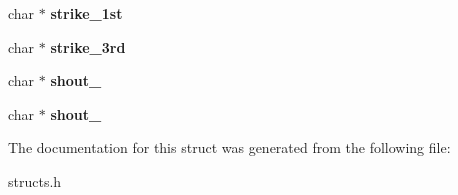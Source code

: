 \begin{DoxyCompactItemize}
\item 
\hypertarget{structtrap__data_a28d2de746f6ee62bdf3c28672a066141}{char $\ast$ {\bfseries strike\-\_\-1st}}\label{structtrap__data_a28d2de746f6ee62bdf3c28672a066141}

\item 
\hypertarget{structtrap__data_a32b2eada9b8ea8c2eede402df18c01bd}{char $\ast$ {\bfseries strike\-\_\-3rd}}\label{structtrap__data_a32b2eada9b8ea8c2eede402df18c01bd}

\item 
\hypertarget{structtrap__data_a1c0410d9842861b6f656e72166b7d26b}{char $\ast$ {\bfseries shout\-\_}}\label{structtrap__data_a1c0410d9842861b6f656e72166b7d26b}

\item 
\hypertarget{structtrap__data_a3facc366355d40f4fe424915a83290e4}{char $\ast$ {\bfseries shout\-\_}}\label{structtrap__data_a3facc366355d40f4fe424915a83290e4}

\end{DoxyCompactItemize}


The documentation for this struct was generated from the following file\-:\begin{DoxyCompactItemize}
\item 
structs.\-h\end{DoxyCompactItemize}
